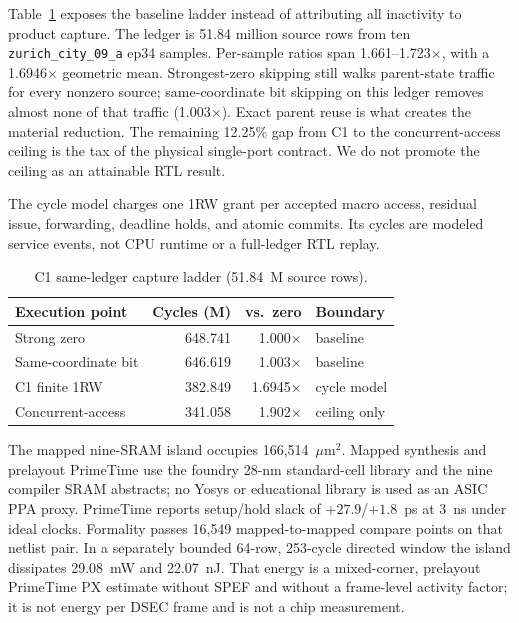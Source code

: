 \documentclass[journal]{IEEEtran}
\begin{document}
Table~\ref{tab:c1ladder} exposes the baseline ladder instead of attributing
all inactivity to product capture.  The ledger is 51.84 million source rows
from ten \texttt{zurich\_city\_09\_a} ep34 samples.  Per-sample ratios span
1.661--1.723$\times$, with a 1.6946$\times$ geometric mean.  Strongest-zero
skipping still walks parent-state traffic for every nonzero source;
same-coordinate bit skipping on this ledger removes almost none of that
traffic (1.003$\times$).  Exact parent reuse is what creates the material
reduction.  The remaining 12.25\% gap from C1 to the concurrent-access
ceiling is the tax of the physical single-port contract.  We do not promote
the ceiling as an attainable RTL result.

The cycle model charges one 1RW grant per accepted macro access, residual
issue, forwarding, deadline holds, and atomic commits.  Its cycles are
modeled service events, not CPU runtime or a full-ledger RTL replay.

\begin{table}[t]
\caption{C1 same-ledger capture ladder (51.84~M source rows).}
\label{tab:c1ladder}
\centering
\scriptsize
\begin{tabular}{@{}lrrl@{}}
\toprule
Execution point & Cycles (M) & vs.\ zero & Boundary \\
\midrule
Strong zero & 648.741 & 1.000$\times$ & baseline \\
Same-coordinate bit & 646.619 & 1.003$\times$ & baseline \\
C1 finite 1RW & 382.849 & 1.6945$\times$ & cycle model \\
Concurrent-access & 341.058 & 1.902$\times$ & ceiling only \\
\bottomrule
\end{tabular}
\end{table}

The mapped nine-SRAM island occupies 166{,}514~$\mu$m$^2$.  Mapped synthesis
and prelayout PrimeTime use the foundry 28-nm standard-cell library and the
nine compiler SRAM abstracts; no Yosys or educational library is used as an
ASIC PPA proxy.  PrimeTime reports setup/hold slack of $+27.9$/$+1.8$~ps at
3~ns under ideal clocks.  Formality passes 16{,}549 mapped-to-mapped compare
points on that netlist pair.  In a separately bounded 64-row, 253-cycle
directed window the island dissipates 29.08~mW and 22.07~nJ.  That energy is
a mixed-corner, prelayout PrimeTime PX estimate without SPEF and without a
frame-level activity factor; it is not energy per DSEC frame and is not a
chip measurement.
\end{document}
